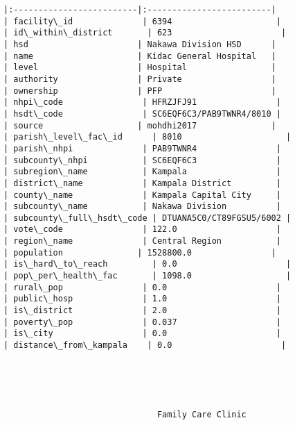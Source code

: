 \documentclass[11pt]{article}
\begin{document}
\begin{Verbatim}[commandchars=\\\{\}]
|:-------------------------|:-------------------------|
| facility\_id              | 6394                     |
| id\_within\_district       | 623                      |
| hsd                      | Nakawa Division HSD      |
| name                     | Kidac General Hospital   |
| level                    | Hospital                 |
| authority                | Private                  |
| ownership                | PFP                      |
| nhpi\_code                | HFRZJFJ91                |
| hsdt\_code                | SC6EQF6C3/PAB9TWNR4/8010 |
| source                   | mohdhi2017               |
| parish\_level\_fac\_id      | 8010                     |
| parish\_nhpi              | PAB9TWNR4                |
| subcounty\_nhpi           | SC6EQF6C3                |
| subregion\_name           | Kampala                  |
| district\_name            | Kampala District         |
| county\_name              | Kampala Capital City     |
| subcounty\_name           | Nakawa Division          |
| subcounty\_full\_hsdt\_code | DTUANA5C0/CT89FGSU5/6002 |
| vote\_code                | 122.0                    |
| region\_name              | Central Region           |
| population               | 1528800.0                |
| is\_hard\_to\_reach         | 0.0                      |
| pop\_per\_health\_fac       | 1098.0                   |
| rural\_pop                | 0.0                      |
| public\_hosp              | 1.0                      |
| is\_district              | 2.0                      |
| poverty\_pop              | 0.037                    |
| is\_city                  | 0.0                      |
| distance\_from\_kampala    | 0.0                      |





                               Family Care Clinic                               


\end{Verbatim}
\end{document}
